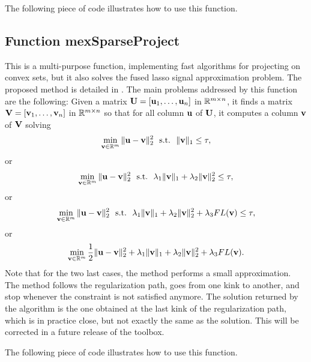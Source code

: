 \documentclass[a4paper, 11pt]{article}
\begin{document}
%    

The following piece of code illustrates how to use this function.



\subsection{Function mexSparseProject}
This is a multi-purpose function, implementing fast algorithms for projecting
on convex sets, but it also solves the fused lasso signal approximation
problem. The proposed method is detailed in \cite{mairal9}.  The main problems
addressed by this function are the following: Given a matrix
${\mathbf U}=[{\mathbf u}_1,\ldots,{\mathbf u}_n]$ in ${\mathbb R}^{m \times n}$, it finds a matrix
${\mathbf V}=[{\mathbf v}_1,\ldots,{\mathbf v}_n]$ in ${\mathbb R}^{m \times n}$ so that for all column ${\mathbf u}$ of ${\mathbf U}$,
   it computes a column ${\mathbf v}$ of ${\mathbf V}$ solving
   \begin{equation}
   \min_{{\mathbf v} \in {\mathbb R}^m} \|{\mathbf u}-{\mathbf v}\|_2^2  ~~\text{s.t.}~~ \|{\mathbf v}\|_1 \leq \tau,
   \end{equation}
   or
   \begin{equation}
   \min_{{\mathbf v} \in {\mathbb R}^m} \|{\mathbf u}-{\mathbf v}\|_2^2  ~~\text{s.t.}~~ \lambda_1\|{\mathbf v}\|_1 +\lambda_2\|{\mathbf v}\|_2^2\leq \tau,
   \end{equation}
   or
   \begin{equation}
   \min_{{\mathbf v} \in {\mathbb R}^m} \|{\mathbf u}-{\mathbf v}\|_2^2  ~~\text{s.t.}~~ \lambda_1\|{\mathbf v}\|_1 +\lambda_2\|{\mathbf v}\|_2^2+ \lambda_3 FL({\mathbf v}) \leq \tau,
   \end{equation}
   or
   \begin{equation}
   \min_{{\mathbf v} \in {\mathbb R}^m} \frac{1}{2}\|{\mathbf u}-{\mathbf v}\|_2^2 + \lambda_1\|{\mathbf v}\|_1 +\lambda_2\|{\mathbf v}\|_2^2+ \lambda_3 FL({\mathbf v}).
   \end{equation}
   Note that for the two last cases, the method performs a small approximation.
   The method follows the regularization path, goes from one kink to another, and 
   stop whenever the constraint is not satisfied anymore. The solution returned 
   by the algorithm is the one obtained at the last kink of the regularization path,
   which is in practice close, but not exactly the same as the solution.
   This will be corrected in a future release of the toolbox.

%    

The following piece of code illustrates how to use this function.

\end{document}
